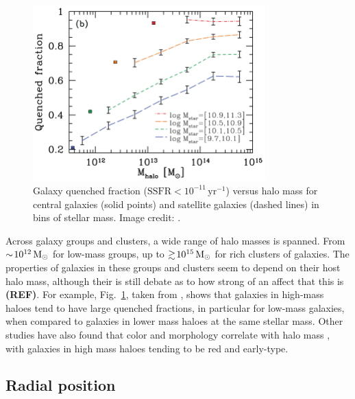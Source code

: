 \begin{figure}
  \centering
  \includegraphics[width=0.8\textwidth]{quenchFrac_wetzel.png}
  \caption[Quenched fraction versus halo mass, for various stellar
    mass bins]{Galaxy quenched fraction ($\mathrm{SSFR} <
    10^{-11}\,\mathrm{yr^{-1}}$) versus halo mass for central galaxies
    (solid points) and satellite galaxies (dashed lines) in bins of stellar mass.  Image credit: \citet{wetzel2012}.}
  \label{fig:quenchFrac_wetzel}
\end{figure}

Across galaxy groups and clusters, a wide range of halo masses is
spanned.  From $\sim\! 10^{12}\,\mathrm{M_{\odot}}$ for low-mass groups, up to
$\gtrsim\! 10^{15}\,\mathrm{M_{\odot}}$ for rich clusters of galaxies.  The
properties of galaxies in these groups and clusters seem to depend on
their host halo mass, although their is still debate as to how strong
of an affect that this is \textbf{(REF)}.  For example,
Fig.~\ref{fig:quenchFrac_wetzel}, taken from \citet{wetzel2012}, shows
that galaxies in high-mass haloes tend to have large quenched
fractions, in particular for low-mass galaxies, when compared to galaxies in lower mass haloes at the same stellar mass.  Other studies have
also found that color and morphology correlate with halo mass
\citep[e.g.][]{kimm2009, wilman2012}, with galaxies in high mass
haloes tending to be red and early-type.

\subsection{Radial position}
\label{sec:radial_pos}

